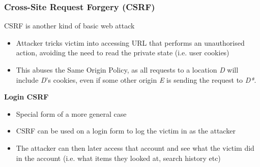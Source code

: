 \documentclass{article}
\begin{document}
\subsubsection{Cross-Site Request Forgery (CSRF)}
CSRF is another kind of basic web attack
\begin{itemize}
    \item Attacker tricks victim into accessing URL that performs an unauthorised action, avoiding the need to read the private state (i.e. user cookies)
    \item This abuses the Same Origin Policy, as all requests to a location \textit{D} will include \textit{D}'s cookies, even if some other origin \textit{E} is sending the request to \textit{D*}.
\end{itemize}
\textbf{Login CSRF}
\begin{itemize}
    \item Special form of a more general case
    \item CSRF can be used on a login form to log the victim in as the attacker
    \item The attacker can then later access that account and see what the victim did in the account (i.e. what items they looked at, search history etc)
\end{itemize}
\end{document}
